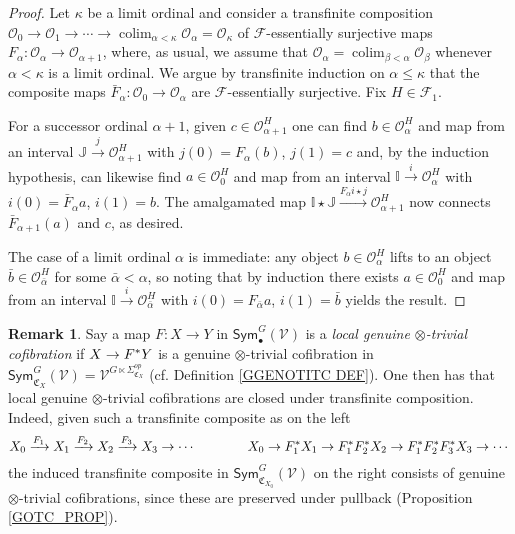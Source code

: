 \documentclass[a4paper,10pt
 ,final
]{article}%
\numberwithin{equation}{section}
\numberwithin{figure}{section}
\theoremstyle{definition} %
\newtheorem{remark}[equation]{Remark}%
\DeclareMathOperator{\colim}{colim}%
\newcommand{\F}{\ensuremath{\mathcal F}}
\newcommand{\V}{\ensuremath{\mathcal V}}
\renewcommand{\O}{\ensuremath{\mathcal O}}
\newcommand{\1}{\ensuremath{\mathbbm 1}}%
\begin{document}
\begin{proof}
Let $\kappa$ be a limit ordinal and consider a transfinite composition
$\O_0 \to \O_1 \to \cdots 
\to \colim_{\alpha < \kappa} \O_{\alpha} = \O_{\kappa}$
of $\F$-essentially surjective maps
$F_{\alpha} \colon \O_{\alpha} \to \O_{\alpha +1}$, where, as usual, 
we assume that $\O_{\alpha} = \colim_{\beta < \alpha} \O_{\beta}$ whenever $\alpha < \kappa$ is a limit ordinal.
We argue by transfinite induction on $\alpha \leq \kappa$
that the composite maps $\bar{F}_{\alpha} \colon \O_0 \to \O_{\alpha}$
are $\F$-essentially surjective. Fix $H \in \F_1$.

For a successor ordinal $\alpha+1$, given $c \in \O_{\alpha+1}^H$
one can find $b \in \O_\alpha^H$ and map from an interval 
$\mathbb{J} \xrightarrow{j} \O_{\alpha+1}^H$ with $j(0) = F_{\alpha}(b)$, $j(1)=c$
and, by the induction hypothesis, can likewise find
$a \in \O_0^H$ and map from an interval $\mathbb{I} \xrightarrow{i} \O_\alpha^H$
with $i(0)=\bar{F}_{\alpha}a$, $i(1)=b$.
The amalgamated map
$\mathbb{I} \star \mathbb{J} \xrightarrow{F_{\alpha}i \star j} \O_{\alpha+1}^H$
now connects $\bar{F}_{\alpha+1}(a)$ and $c$, as desired.

The case of a limit ordinal $\alpha$ is immediate: any object $b \in \O_{\alpha}^H$
lifts to an object $\bar{b} \in \O_{\bar{\alpha}}^H$ for some $\bar{\alpha} < \alpha$,
so noting that by induction there exists $a \in \O_0^H$ and map from an interval $\mathbb{I} \xrightarrow{i} \O_{\bar{\alpha}}^H$
with $i(0) = F_{\bar{\alpha}}a$, $i(1) = \bar{b}$ yields the result.
\end{proof}



\begin{remark}\label{LOCOTIMESTRI REM}
	Say a map $F \colon X \to Y$ in 
	$\mathsf{Sym}^{G}_{\bullet}(\V)$
	is a \emph{local genuine $\otimes$-trivial cofibration}
	if  
	$X \to F^{\**}Y$ is a 
	genuine $\otimes$-trivial cofibration in 
	$\mathsf{Sym}^{G}_{\mathfrak{C}_X}(\V) = \V^{G \ltimes \Sigma^{op}_{\mathfrak{C}_{X}}}$
	(cf. Definition \ref{GGENOTITC DEF}).
One then has that local genuine $\otimes$-trivial cofibrations are closed under transfinite composition.
Indeed, given such a transfinite composite as on the left
\[
X_0 \xrightarrow{F_1} 
X_1 \xrightarrow{F_2}
X_2 \xrightarrow{F_3}
X_3 \to \cdots 
\qquad \qquad 
X_0 \to  
F_1^{\**} X_1 \to
F_1^{\**}F_2^{\**}X_2 \to
F_1^{\**}F_2^{\**}F_3^{\**}X_3 \to \cdots 
\]
the induced transfinite composite in $\mathsf{Sym}^{G}_{\mathfrak{C}_{X_0}}(\V)$
on the right consists of 
genuine $\otimes$-trivial cofibrations,
since these are preserved under pullback
(Proposition \ref{GOTC_PROP}).
\end{remark}
\end{document}
